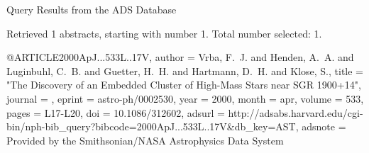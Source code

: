 Query Results from the ADS Database


Retrieved 1 abstracts, starting with number 1.  Total number selected: 1.

@ARTICLE{2000ApJ...533L..17V,
   author = {{Vrba}, F.~J. and {Henden}, A.~A. and {Luginbuhl}, C.~B. and 
	{Guetter}, H.~H. and {Hartmann}, D.~H. and {Klose}, S.},
    title = "{The Discovery of an Embedded Cluster of High-Mass Stars near SGR 1900+14}",
  journal = {\apjl},
   eprint = {astro-ph/0002530},
     year = 2000,
    month = apr,
   volume = 533,
    pages = {L17-L20},
      doi = {10.1086/312602},
   adsurl = {http://adsabs.harvard.edu/cgi-bin/nph-bib_query?bibcode=2000ApJ...533L..17V&db_key=AST},
  adsnote = {Provided by the Smithsonian/NASA Astrophysics Data System}
}


